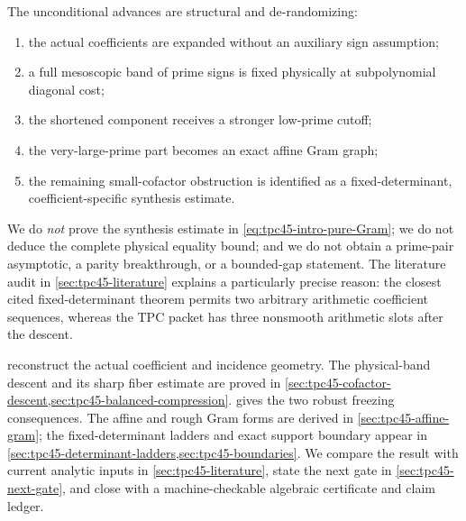 The unconditional advances are structural and de-randomizing:
\begin{enumerate}[label=(\roman*),leftmargin=2.1em]
 \item the actual coefficients are expanded without an auxiliary sign
 assumption;
 \item a full mesoscopic band of prime signs is fixed physically at
 subpolynomial diagonal cost;
 \item the shortened component receives a stronger low-prime cutoff;
 \item the very-large-prime part becomes an exact affine Gram graph;
 \item the remaining small-cofactor obstruction is identified as a
 fixed-determinant, coefficient-specific synthesis estimate.
\end{enumerate}
We do \emph{not} prove the synthesis estimate in
\eqref{eq:tpc45-intro-pure-Gram}; we do not deduce the complete
physical equality bound; and we do not obtain a prime-pair asymptotic,
a parity breakthrough, or a bounded-gap statement.  The literature
audit in \cref{sec:tpc45-literature} explains a particularly precise
reason: the closest cited fixed-determinant theorem permits two arbitrary
arithmetic coefficient sequences, whereas the TPC packet has three
nonsmooth arithmetic slots after the descent.

 reconstruct the actual
coefficient and incidence geometry.  The physical-band descent and its
sharp fiber estimate are proved in
\cref{sec:tpc45-cofactor-descent,sec:tpc45-balanced-compression}.
 gives the two robust freezing
consequences.  The affine and rough Gram forms are derived in
\cref{sec:tpc45-affine-gram}; the fixed-determinant ladders and exact
support boundary appear in
\cref{sec:tpc45-determinant-ladders,sec:tpc45-boundaries}.
We compare the result with current analytic inputs in
\cref{sec:tpc45-literature}, state the next gate in
\cref{sec:tpc45-next-gate}, and close with a machine-checkable algebraic
certificate and claim ledger.
